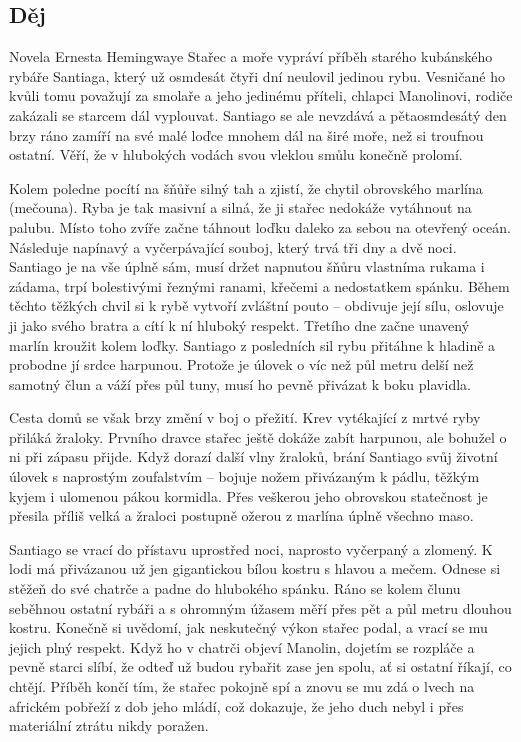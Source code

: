 \documentclass[12pt, a4paper]{article}
\begin{document}
{\color{subsectioncolor}\hrulefill}
\subsection*{\color{subsectioncolor}Děj}
Novela Ernesta Hemingwaye Stařec a moře vypráví příběh starého kubánského rybáře Santiaga, který už osmdesát čtyři dní neulovil jedinou rybu. Vesničané ho kvůli tomu považují za smolaře a jeho jedinému příteli, chlapci Manolinovi, rodiče zakázali se starcem dál vyplouvat. Santiago se ale nevzdává a pětaosmdesátý den brzy ráno zamíří na své malé loďce mnohem dál na širé moře, než si troufnou ostatní. Věří, že v hlubokých vodách svou vleklou smůlu konečně prolomí.

Kolem poledne pocítí na šňůře silný tah a zjistí, že chytil obrovského marlína (mečouna). Ryba je tak masivní a silná, že ji stařec nedokáže vytáhnout na palubu. Místo toho zvíře začne táhnout loďku daleko za sebou na otevřený oceán. Následuje napínavý a vyčerpávající souboj, který trvá tři dny a dvě noci. Santiago je na vše úplně sám, musí držet napnutou šňůru vlastníma rukama i zádama, trpí bolestivými řeznými ranami, křečemi a nedostatkem spánku. Během těchto těžkých chvil si k rybě vytvoří zvláštní pouto – obdivuje její sílu, oslovuje ji jako svého bratra a cítí k ní hluboký respekt. Třetího dne začne unavený marlín kroužit kolem loďky. Santiago z posledních sil rybu přitáhne k hladině a probodne jí srdce harpunou. Protože je úlovek o víc než půl metru delší než samotný člun a váží přes půl tuny, musí ho pevně přivázat k boku plavidla.

Cesta domů se však brzy změní v boj o přežití. Krev vytékající z mrtvé ryby přiláká žraloky. Prvního dravce stařec ještě dokáže zabít harpunou, ale bohužel o ni při zápasu přijde. Když dorazí další vlny žraloků, brání Santiago svůj životní úlovek s naprostým zoufalstvím – bojuje nožem přivázaným k pádlu, těžkým kyjem i ulomenou pákou kormidla. Přes veškerou jeho obrovskou statečnost je přesila příliš velká a žraloci postupně ožerou z marlína úplně všechno maso.

Santiago se vrací do přístavu uprostřed noci, naprosto vyčerpaný a zlomený. K lodi má přivázanou už jen gigantickou bílou kostru s hlavou a mečem. Odnese si stěžeň do své chatrče a padne do hlubokého spánku. Ráno se kolem člunu seběhnou ostatní rybáři a s ohromným úžasem měří přes pět a půl metru dlouhou kostru. Konečně si uvědomí, jak neskutečný výkon stařec podal, a vrací se mu jejich plný respekt. Když ho v chatrči objeví Manolin, dojetím se rozpláče a pevně starci slíbí, že odteď už budou rybařit zase jen spolu, ať si ostatní říkají, co chtějí. Příběh končí tím, že stařec pokojně spí a znovu se mu zdá o lvech na africkém pobřeží z dob jeho mládí, což dokazuje, že jeho duch nebyl i přes materiální ztrátu nikdy poražen.
\end{document}
